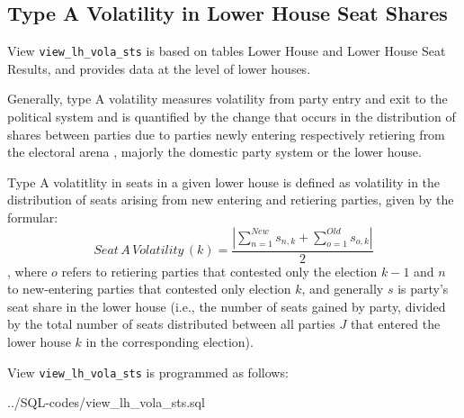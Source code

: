 \subsection{Type A Volatility in Lower House Seat Shares}\label{subsec_view_lh_vola_sts}
View \texttt{\footnotesize view\_lh\_vola\_sts} is based on tables Lower House and Lower House Seat Results, and provides data at the level of lower houses.

Generally, type A volatility measures volatility from party entry and exit to the political system and is quantified by the change that occurs in the distribution of shares between parties due to parties newly entering respectively retiering from the electoral arena \citep{Powell&Tucker2013}, majorly the domestic party system or the lower house. 

Type A volatitlity in seats in a given lower house is defined as volatility in the distribution of seats arising from new entering and retiering parties, given by the formular: 
\begin{equation}\label{equ_seat_a_volatility}
Seat\,A\,Volatility\,(k) = \frac{ | \sum\limits_{n=1}^{New} s_{n,k} + \sum\limits_{o=1}^{Old} s_{o,k} | }{2}
\end{equation}
, where $o$ refers to retiering parties that contested only the election $k-1$ and $n$ to new-entering
parties that contested only election $k$, and generally $s$ is party's seat share in the lower house (i.e., the number of seats gained by party, divided by the total number of seats distributed between all parties $J$ that entered the lower house $k$ in the corresponding election).




View \texttt{\footnotesize view\_lh\_vola\_sts} is programmed as follows:

%
{../SQL-codes/view_lh_vola_sts.sql}

